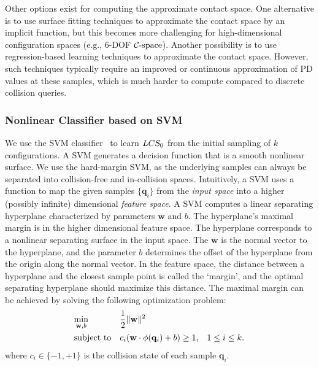 Other options exist for computing the approximate contact space.
One alternative is to use surface fitting techniques to approximate the contact space by an implicit function, but this becomes more challenging for high-dimensional configuration spaces (e.g., 6-DOF $\mathcal C\text{-space}$). Another possibility is to use regression-based learning techniques to approximate the contact space. However, such techniques typically require an improved or continuous approximation of PD values at these samples, which is much harder to compute compared to discrete collision queries.

\subsubsection{Nonlinear Classifier based on SVM}
We use the SVM classifier~\cite{Vapnik:1995:NSL} to learn $LCS_0$ from
the initial sampling of $k$ configurations.
A SVM generates a decision function that is a smooth nonlinear surface. We use the
hard-margin SVM, as the underlying samples can
always be separated into collision-free and in-collision spaces. Intuitively, a SVM 
uses a function to map the given samples $\{\mathbf q_i\}$ from the \emph{input space} into a higher (possibly infinite) dimensional \emph{feature space}.
A SVM computes a linear
separating hyperplane characterized by parameters $\mathbf w$ and $b$. The hyperplane's maximal margin
is in the higher dimensional feature space. The hyperplane corresponds to a nonlinear separating surface in the input space. The $\mathbf w$ is the normal vector to the hyperplane, and the
parameter $b$ determines the offset of the hyperplane from the
origin along the normal vector. In the feature space, the distance between a hyperplane and the closest sample point is
called the `margin', and the optimal separating hyperplane should maximize this distance.
The maximal margin can be achieved by solving the following
optimization problem:
\begin{align}
\label{eq:2:svm1}
& \underset{\mathbf w, b}{\text{min}} & & \frac{1}{2}\|\mathbf w\|^2 & &  \\
& \text{subject to} & & c_i (\mathbf w \cdot \phi(\mathbf q_i) + b)
\geq 1, & & 1 \leq i \leq k. \notag
\end{align}
where $c_i \in \{-1,+1\}$ is the collision state of each sample ${\mathbf q_i}$.


